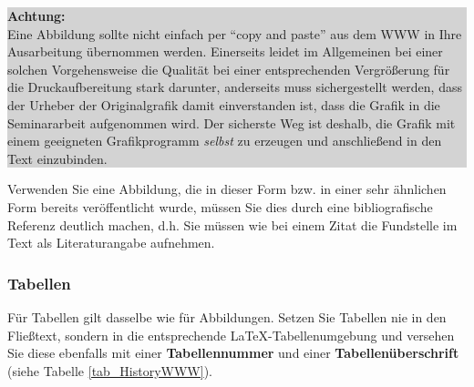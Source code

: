 \begin{center}
\colorbox{lightgray}{
\parbox{140mm}{
{\bf Achtung:} \\
Eine Abbildung sollte nicht einfach per "`copy and paste"' aus dem WWW in Ihre Ausarbeitung übernommen werden. 
Einerseits leidet im Allgemeinen bei einer solchen Vorgehensweise die Qualität bei einer entsprechenden Vergrößerung für die Druckaufbereitung stark darunter, anderseits muss sichergestellt werden, dass der Urheber der Originalgrafik damit einverstanden ist, dass die Grafik in die Seminararbeit aufgenommen wird.
Der sicherste Weg ist deshalb, die Grafik mit einem geeigneten Grafikprogramm {\em selbst} zu erzeugen und anschließend in den Text einzubinden.}}
\end{center}

\smallskip

Verwenden Sie eine Abbildung, die in dieser Form bzw. in einer sehr ähnlichen Form bereits veröffentlicht wurde, müssen Sie dies durch eine bibliografische Referenz deutlich machen, d.h. Sie müssen wie bei einem Zitat die Fundstelle im Text als Literaturangabe aufnehmen.



\subsubsection{Tabellen}
Für Tabellen gilt dasselbe wie für Abbildungen.
Setzen Sie Tabellen nie in den Fließtext, sondern in die entsprechende \LaTeX-Tabellenumgebung und versehen Sie diese ebenfalls mit einer \textbf{Tabellennummer} und einer \textbf{Tabellenüberschrift} (siehe Tabelle \ref{tab_HistoryWWW}).

